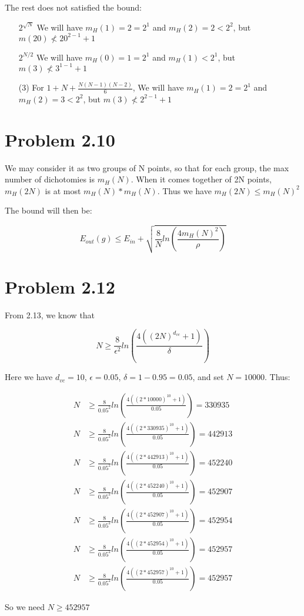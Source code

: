 \documentclass{article}
\def\math#1{$#1$}
\begin{document}
The rest does not satisfied the bound: 

\begin{itemize}
    \item [\math{2^{\sqrt{N}}}] We will have \math{m_H(1) = 2 = 2^1} and \math{m_H(2) = 2 < 2^2}, but \math{m(20) \nless 20^{2 - 1} + 1}
    \item [\math{2^{N / 2}}] We will have \math{m_H(0) = 1 = 2^1} and \math{m_H(1) < 2^1}, but \math{m(3) \nless 3^{1 - 1} + 1}
    \item [(3)] For \math{1 + N + \frac{N(N - 1)(N - 2)}{6}}, We will have \math{m_H(1) = 2 = 2^1} and \math{m_H(2) = 3 < 2^2}, but \math{m(3) \nless 2^{2 - 1} + 1}
\end{itemize}

\section{Problem 2.10}

We may consider it as two groups of N points, so that for each group, the max number of dichotomies is \math{m_H(N)}. When it comes together of 2N points, \math{m_H(2N)} is at most \math{m_H(N) * m_H(N)}. Thus we have \math{m_H(2N) \leq m_H(N)^2}

The bound will then be: 

\begin{equation}
    E_{out}(g) \leq E_{in} + \sqrt{\frac{8}{N}ln(\frac{4m_H(N)^2}{\rho})}
\end{equation}

\section{Problem 2.12}

From 2.13, we know that 

\begin{equation}
    N \geq \frac{8}{\epsilon^2}ln(\frac{4((2N)^{d_{vc}} + 1)}{\delta})
\end{equation}

Here we have \math{d_{vc} = 10}, \math{\epsilon = 0.05}, \math{\delta = 1 - 0.95 = 0.05}, and set \math{N = 10000}. Thus: 

\begin{equation}
    \begin{split}
        N & \geq \frac{8}{0.05^2}ln(\frac{4((2 * 10000)^{10} + 1)}{0.05}) = 330935 \\
        N & \geq \frac{8}{0.05^2}ln(\frac{4((2 * 330935)^{10} + 1)}{0.05}) = 442913 \\
        N & \geq \frac{8}{0.05^2}ln(\frac{4((2 * 442913)^{10} + 1)}{0.05}) = 452240 \\
        N & \geq \frac{8}{0.05^2}ln(\frac{4((2 * 452240)^{10} + 1)}{0.05}) = 452907 \\
        N & \geq \frac{8}{0.05^2}ln(\frac{4((2 * 452907)^{10} + 1)}{0.05}) = 452954 \\
        N & \geq \frac{8}{0.05^2}ln(\frac{4((2 * 452954)^{10} + 1)}{0.05}) = 452957 \\
        N & \geq \frac{8}{0.05^2}ln(\frac{4((2 * 452957)^{10} + 1)}{0.05}) = 452957
    \end{split}
\end{equation}

So we need \math{N \geq 452957}
\end{document}
